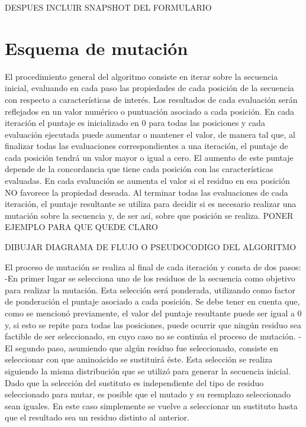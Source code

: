 DESPUES INCLUIR SNAPSHOT DEL FORMULARIO


\section{Esquema de mutación}

El procedimiento general del algoritmo consiste en iterar sobre la secuencia inicial, evaluando en cada paso las propiedades de cada posición de la secuencia con respecto a características de interés. 
Los resultados de cada evaluación serán reflejados en un valor numérico o puntuación asociado a cada posición. En cada iteración el puntaje es inicializado en 0 para todas las posiciones y cada evaluación ejecutada puede aumentar o mantener el valor, de manera tal que, al finalizar todas las evaluaciones correspondientes a una iteración, el puntaje de cada posición tendrá un valor mayor o igual a cero. 
El aumento de este puntaje depende de la concordancia que tiene cada posición con las características evaluadas. En cada evaluación se aumenta el valor si el residuo en esa posición NO favorece la propiedad deseada.
Al terminar todas las evaluaciones de cada iteración, el puntaje resultante se utiliza para decidir si es necesario realizar una mutación sobre la secuencia y, de ser así, sobre que posición se realiza.
PONER EJEMPLO PARA QUE QUEDE CLARO

DIBUJAR DIAGRAMA DE FLUJO O PSEUDOCODIGO DEL ALGORITMO

El proceso de mutación se realiza al final de cada iteración y consta de dos pasos:
    -En primer lugar se selecciona uno de los residuos de la secuencia como objetivo para realizar la mutación. Esta selección será ponderada, utilizando como factor de ponderación el puntaje asociado a cada posición. Se debe tener en cuenta que, como se mencionó previamente, el valor del puntaje resultante puede ser igual a 0 y, si esto se repite para todas las posiciones, puede ocurrir que ningún residuo sea factible de ser seleccionado, en cuyo caso no se continúa el proceso de mutación. 
    -El segundo paso, asumiendo que algún residuo fue seleccionado, consiste en seleccionar con que aminoácido se sustituirá éste. Esta selección se realiza siguiendo la misma distribución que se utilizó para generar la secuencia inicial. Dado que la selección del sustituto es independiente del tipo de residuo seleccionado para mutar, es posible que el mutado y su reemplazo seleccionado sean iguales. En este caso simplemente se vuelve a seleccionar un sustituto hasta que el resultado sea un residuo distinto al anterior.     


